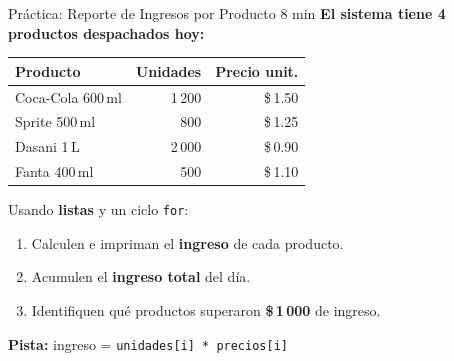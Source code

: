 \documentclass[aspectratio=169, 11pt]{beamer}
\begin{document}
\begin{frame}[fragile,shrink=30]{Práctica: Reporte de Ingresos por Producto \hfill {\normalsize\color{arcaRed}\faClock\hspace{4pt}8 min}}
  \vspace{-6pt}
  {\small\color{arcaDark}\bfseries
    El sistema tiene 4 productos despachados hoy:}

  \vspace{4pt}
  \begin{center}
  {\footnotesize
  \renewcommand{\arraystretch}{1.2}
  \begin{tabular}{l r r}
    \toprule
    {\bfseries\color{arcaDark} Producto}
    & {\bfseries\color{arcaDark} Unidades}
    & {\bfseries\color{arcaDark} Precio unit.} \\
    \midrule
    Coca-Cola 600\,ml & 1\,200 & \$\,1.50 \\
    Sprite 500\,ml    &   800  & \$\,1.25 \\
    Dasani 1\,L       & 2\,000 & \$\,0.90 \\
    Fanta 400\,ml     &   500  & \$\,1.10 \\
    \bottomrule
  \end{tabular}
  }
  \end{center}

  \vspace{2pt}
  {\footnotesize\color{textMuted}
    Usando \textbf{listas} y un ciclo \texttt{for}:}

  \vspace{2pt}
  {\footnotesize
  \begin{enumerate}\setlength{\itemsep}{2pt}
    \item[{\color{arcaRed}\bfseries 1.}]
      Calculen e impriman el \textbf{ingreso} de cada producto.
    \item[{\color{arcaRed}\bfseries 2.}]
      Acumulen el \textbf{ingreso total} del día.
    \item[{\color{arcaRed}\bfseries 3.}]
      Identifiquen qué productos superaron \textbf{\$\,1\,000} de ingreso.
  \end{enumerate}
  }

  \vspace{2pt}
  {\scriptsize\color{textMuted}
    \faLightbulb[regular]\hspace{4pt}\textbf{Pista:}
    ingreso = \texttt{unidades[i] * precios[i]}}
\end{frame}
\end{document}
